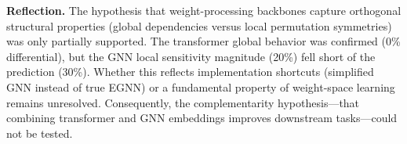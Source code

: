 \textbf{Reflection.} The hypothesis that weight-processing backbones capture orthogonal structural properties (global dependencies versus local permutation symmetries) was only partially supported. The transformer global behavior was confirmed (0\% differential), but the GNN local sensitivity magnitude (20\%) fell short of the prediction (30\%). Whether this reflects implementation shortcuts (simplified GNN instead of true EGNN) or a fundamental property of weight-space learning remains unresolved. Consequently, the complementarity hypothesis---that combining transformer and GNN embeddings improves downstream tasks---could not be tested.
